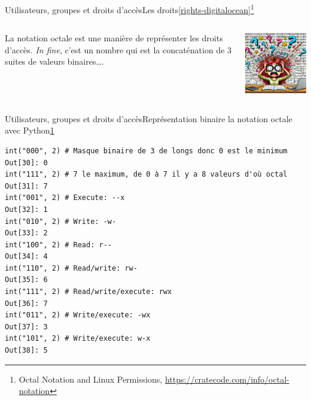 \documentclass{beamer}
\begin{document}
    \begin{frame}{Utilisateurs, groupes et droits d'accès}{Les droits\cref{rights-digitalocean}\footnotestep\footnote{\label{octal}Octal Notation and Linux Permissions, \url{https://cratecode.com/info/octal-notation}}}
        \begin{columns}
            La notation octale est une manière de représenter les droits d'accès.
            \bigbreak
            \textit{In fine}, c'est un nombre qui est la concaténation de 3 suites de valeurs binaires\ldots.
            \begin{center}
                \includegraphics[width=6.5cm]{image/binary-explosion}
            \end{center}
        \end{columns}
    \end{frame}

    \begin{frame}[fragile]{Utilisateurs, groupes et droits d'accès}{Représentation binaire la notation octale avec Python\cref{octal}}
        \begin{lstlisting}
int("000", 2) # Masque binaire de 3 de longs donc 0 est le minimum
Out[30]: 0
int("111", 2) # 7 le maximum, de 0 à 7 il y a 8 valeurs d'où octal
Out[31]: 7
int("001", 2) # Execute: --x
Out[32]: 1
int("010", 2) # Write: -w-
Out[33]: 2
int("100", 2) # Read: r--
Out[34]: 4
int("110", 2) # Read/write: rw-
Out[35]: 6
int("111", 2) # Read/write/execute: rwx
Out[36]: 7
int("011", 2) # Write/execute: -wx
Out[37]: 3
int("101", 2) # Write/execute: w-x
Out[38]: 5
        \end{lstlisting}
    \end{frame}
\end{document}
